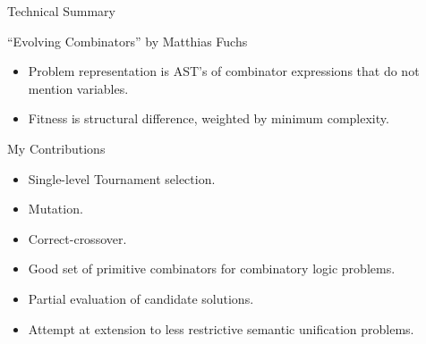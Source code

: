 \documentclass[mathserif]{beamer}
\begin{document}
\begin{frame}{Technical Summary}

\begin{block}{``Evolving Combinators'' by Matthias Fuchs}
\begin{itemize}
\item Problem representation is AST's of combinator expressions that
  do not mention variables.
\item Fitness is structural difference, weighted by minimum complexity.
\end{itemize}

\begin{block}{My Contributions}
\begin{itemize}
\item Single-level Tournament selection.
\item Mutation.
\item Correct-crossover.
\item Good set of primitive combinators for combinatory logic problems.
\item Partial evaluation of candidate solutions.
\item Attempt at extension to less restrictive semantic unification problems.
\end{itemize}
\end{block}



\end{block}


\end{frame}
\end{document}
